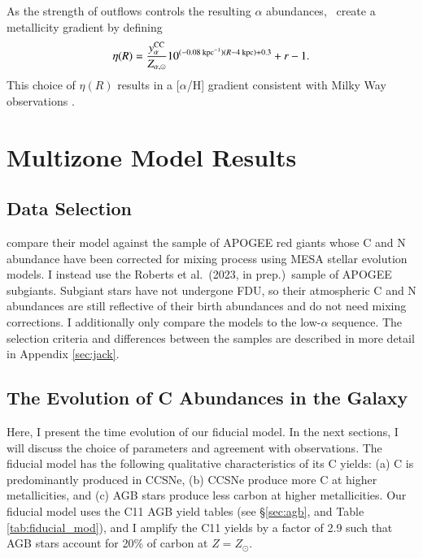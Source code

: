 \documentclass[12pt,oneside]{report}
\newcommand{\JJ}{\citetalias{james+21}}
\newcommand{\citetjack}{Roberts et al.~(2023, in prep.)}
\begin{document}
As the strength of outflows controls the resulting $\alpha$ abundances, \JJ~create a metallicity gradient by defining
\begin{equation}
\eta(R) = \frac{y_{\alpha}^{\rm CC}}{Z_{\alpha, \odot}} 10^{(-0.08\text{ kpc}^{-1})(R-4\text{ kpc})+0.3} + r - 1.
\end{equation}
This choice of $\eta(R)$ results in a [$\alpha$/H] gradient consistent with Milky Way observations \citep[e.g.][]{hayden+14, weinberg+19, frinchaboy+13}.


\chapter{Multizone Model Results}
\section{Data Selection}

\citet{james+23} compare their model against the \cite{vincenzo+21} sample of APOGEE \citep{apogee17} red giants whose C and N abundance have been corrected for mixing process using MESA stellar evolution models. 
I instead use the \citetjack~sample of APOGEE subgiants. Subgiant stars have not undergone FDU, so their atmospheric C and N abundances are still reflective of their birth abundances and do not need mixing corrections. I additionally only compare the models to the low-$\alpha$ sequence.  The selection criteria and differences between the samples are described in more detail in Appendix \ref{sec:jack}.



\section{The Evolution of C Abundances in the Galaxy}

Here, I present the time evolution of our fiducial model. In the next sections, I will discuss the choice of parameters and agreement with observations. 
The fiducial model has the following qualitative characteristics of its C yields: (a) C is predominantly produced in CCSNe, (b) CCSNe produce more C at higher metallicities, and (c) AGB stars produce less carbon at higher metallicities. Our fiducial model uses the C11 AGB yield tables (see \S\ref{sec:agb}, and Table \ref{tab:fiducial_mod}), and I amplify the C11 yields by a factor of 2.9 such that AGB stars account for 20\% of carbon at $Z=Z_\odot$. 
\end{document}
